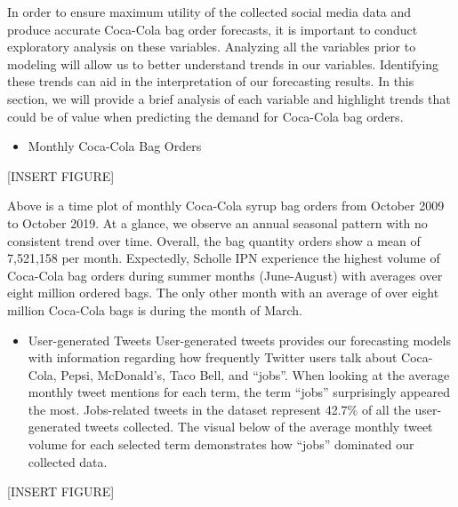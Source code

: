 \documentclass[12pt,oneside]{chicagocapstone}
\providecommand{\tightlist}{%
  \setlength{\itemsep}{0pt}\setlength{\parskip}{0pt}}
\begin{document}
In order to ensure maximum utility of the collected social media data
and produce accurate Coca-Cola bag order forecasts, it is important to
conduct exploratory analysis on these variables. Analyzing all the
variables prior to modeling will allow us to better understand trends in
our variables. Identifying these trends can aid in the interpretation of
our forecasting results. In this section, we will provide a brief
analysis of each variable and highlight trends that could be of value
when predicting the demand for Coca-Cola bag orders.
\begin{itemize}
\tightlist
\item
  Monthly Coca-Cola Bag Orders
\end{itemize}
{[}INSERT FIGURE{]}

Above is a time plot of monthly Coca-Cola syrup bag orders from October
2009 to October 2019. At a glance, we observe an annual seasonal pattern
with no consistent trend over time. Overall, the bag quantity orders
show a mean of 7,521,158 per month. Expectedly, Scholle IPN experience
the highest volume of Coca-Cola bag orders during summer months
(June-August) with averages over eight million ordered bags. The only
other month with an average of over eight million Coca-Cola bags is
during the month of March.
\begin{itemize}
\tightlist
\item
  User-generated Tweets User-generated tweets provides our forecasting
  models with information regarding how frequently Twitter users talk
  about Coca-Cola, Pepsi, McDonald's, Taco Bell, and ``jobs''. When
  looking at the average monthly tweet mentions for each term, the term
  ``jobs'' surprisingly appeared the most. Jobs-related tweets in the
  dataset represent 42.7\% of all the user-generated tweets collected.
  The visual below of the average monthly tweet volume for each selected
  term demonstrates how ``jobs'' dominated our collected data.
\end{itemize}
{[}INSERT FIGURE{]}
\end{document}

